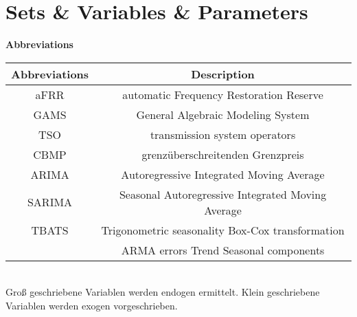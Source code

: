 \chapter*{Sets \& Variables \& Parameters}
\textbf{Abbreviations}
\begin{table}[!h]
	\begin{tabular}{c|c}
		\textbf{Abbreviations} & \textbf{Description}                              \\
		\hline
		aFRR                   & automatic Frequency Restoration Reserve           \\
		GAMS                   & General Algebraic Modeling System                 \\
		TSO                    & transmission system operators                     \\
		CBMP                   & grenzüberschreitenden Grenzpreis                  \\
		ARIMA                  & Autoregressive Integrated Moving Average          \\
		SARIMA                 & Seasonal Autoregressive Integrated Moving Average \\
		TBATS                  & Trigonometric seasonality Box-Cox transformation  \\
		                       & ARMA errors Trend Seasonal components             \\
	\end{tabular}
\end{table}\\

Groß geschriebene Variablen werden endogen ermittelt. Klein geschriebene Variablen werden exogen vorgeschrieben.\\

